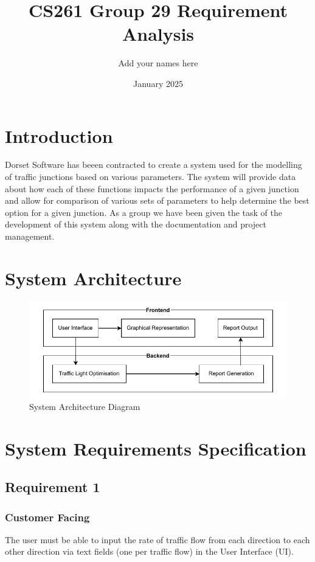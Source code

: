 \documentclass{article}
\title{CS261 Group 29 Requirement Analysis}
\author{Add your names here}
\date{January 2025}
\begin{document}
\maketitle

\section{Introduction}
Dorset Software has beeen contracted to create a system used for the modelling 
of traffic junctions based on various parameters. The system will provide 
data about how each of these functions impacts the performance of a given 
junction and allow for comparison of various sets of parameters to help 
determine the best option for a given junction. As a group we have been given 
the task of the development of this system along with the documentation and 
project management.

\section{System Architecture}
\begin{figure}[H]
    \centering
    \includegraphics[width=0.5\linewidth]{System architecture.drawio.pdf}
    \caption{System Architecture Diagram}
    \label{system architecture}
\end{figure}

\section{System Requirements Specification}
\subsection{Requirement 1}
\subsubsection{Customer Facing}
The user must be able to input the rate of traffic flow from 
each direction to each other direction via text fields (one per traffic flow) 
in the User Interface (UI).
\end{document}
